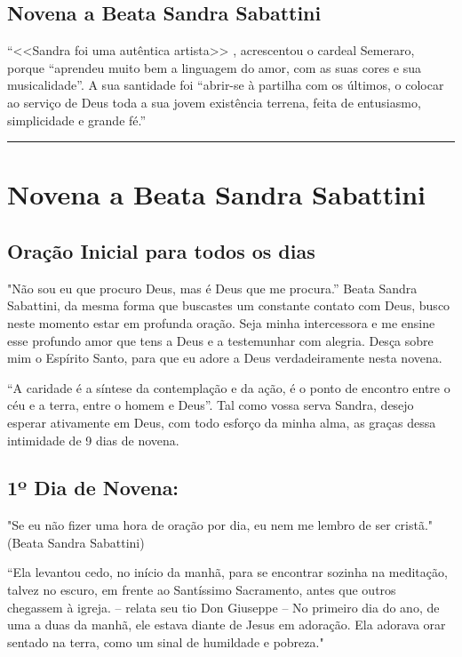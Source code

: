\documentclass[a4paper,14pt]{extarticle} \usepackage[utf8]{inputenc}
\begin{document}
\subsection*{Novena a Beata Sandra Sabattini}


``<<Sandra foi uma autêntica artista>> , acrescentou o cardeal Semeraro, porque “aprendeu muito bem a linguagem do amor, com as suas cores e sua musicalidade”. A sua santidade foi “abrir-se à partilha com os últimos, o colocar ao serviço de Deus toda a sua jovem existência terrena, feita de entusiasmo, simplicidade e grande fé.''
\par\noindent\rule{\textwidth}{0.4pt}

\tableofcontents
\thispagestyle{empty}

\newpage


\newpage
\section{Novena a Beata Sandra Sabattini}
\subsection{Oração Inicial para todos os dias}

"Não sou eu que procuro Deus, mas é Deus que me procura.” Beata Sandra Sabattini, da mesma forma que buscastes um constante contato com Deus, busco neste momento estar em profunda oração. Seja minha intercessora e me ensine esse profundo amor que tens a Deus e a testemunhar com alegria. Desça sobre mim o Espírito Santo, para que eu adore a Deus verdadeiramente nesta novena.

 “A caridade é a síntese da contemplação e da ação, é o ponto de encontro entre o céu e a terra, entre o homem e Deus”. Tal como vossa serva Sandra, desejo esperar ativamente em Deus, com todo esforço da minha alma, as graças dessa intimidade de 9 dias de novena.


\subsection{1º Dia de Novena:} "Se eu não fizer uma hora de oração por dia, eu nem me lembro de ser cristã." (Beata Sandra Sabattini)

“Ela levantou cedo, no início da manhã, para se encontrar sozinha na meditação, talvez no escuro, em frente ao Santíssimo Sacramento, antes que outros chegassem à igreja. – relata seu tio Don Giuseppe – No primeiro dia do ano, de uma a duas da manhã, ele estava diante de Jesus em adoração. Ela adorava orar sentado na terra, como um sinal de humildade e pobreza."
\end{document}
